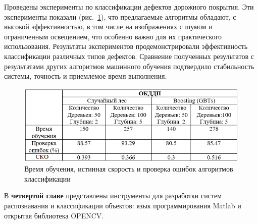 Проведены эксперименты по классификации дефектов дорожного покрытия. Эти эксперименты показали (рис.~\ref{pic1}), что предлагаемые алгоритмы обладают, с высокой эффективностью, в том числе на изображениях с шумом и ограниченным освещением, что особенно важно для их практического использования. Результаты экспериментов продемонстрировали эффективность классификации различных типов дефектов. Сравнение полученных результатов с результатами  других алгоритмов машинного обучения подтвердило стабильность системы, точность и приемлемое время выполнения.
\begin{figure}[ht!]
\centering
\vspace{-0.8em}
\includegraphics [width=1\linewidth]{images/pic1.png}
\caption{Время обучения, истинная скорость и проверка ошибок алгоритмов классификации} \label{pic1}
\vspace{-0.8em}
\end{figure}

В \textbf{четвертой главе} представлены инструменты для разработки систем распознавания и классификации объектов: язык программирования Matlab и открытая библиотека OPENCV.


